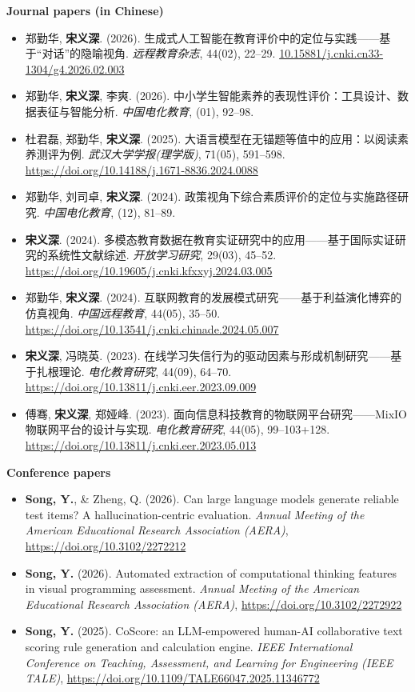 \documentclass[a4paper,9pt]{extarticle}
\begin{document}
\noindent
\textbf{Journal papers (in Chinese)}
\begin{itemize}
    \item 郑勤华, \textbf{宋义深}. (2026). 生成式人工智能在教育评价中的定位与实践——基于“对话”的隐喻视角. \textit{远程教育杂志}, 44(02), 22–29. \url{10.15881/j.cnki.cn33-1304/g4.2026.02.003}
    \item 郑勤华, \textbf{宋义深}, 李爽. (2026). 中小学生智能素养的表现性评价：工具设计、数据表征与智能分析. \textit{中国电化教育}, (01), 92–98.
    \item 杜君磊, 郑勤华, \textbf{宋义深}. (2025). 大语言模型在无锚题等值中的应用：以阅读素养测评为例. \textit{武汉大学学报(理学版)}, 71(05), 591–598. \url{https://doi.org/10.14188/j.1671-8836.2024.0088}
    \item 郑勤华, 刘司卓, \textbf{宋义深}. (2024). 政策视角下综合素质评价的定位与实施路径研究. \textit{中国电化教育}, (12), 81–89.
    \item \textbf{宋义深}. (2024). 多模态教育数据在教育实证研究中的应用——基于国际实证研究的系统性文献综述. \textit{开放学习研究}, 29(03), 45–52. \url{https://doi.org/10.19605/j.cnki.kfxxyj.2024.03.005}
    \item 郑勤华, \textbf{宋义深}. (2024). 互联网教育的发展模式研究——基于利益演化博弈的仿真视角. \textit{中国远程教育}, 44(05), 35–50. \url{https://doi.org/10.13541/j.cnki.chinade.2024.05.007}
    \item \textbf{宋义深}, 冯晓英. (2023). 在线学习失信行为的驱动因素与形成机制研究——基于扎根理论. \textit{电化教育研究}, 44(09), 64–70. \url{https://doi.org/10.13811/j.cnki.eer.2023.09.009}
    \item 傅骞, \textbf{宋义深}, 郑娅峰. (2023). 面向信息科技教育的物联网平台研究——MixIO物联网平台的设计与实现. \textit{电化教育研究}, 44(05), 99–103+128. \url{https://doi.org/10.13811/j.cnki.eer.2023.05.013}
\end{itemize}

\noindent
\textbf{Conference papers}
\begin{itemize}
    \item \textbf{Song, Y.}, \& Zheng, Q. (2026). Can large language models generate reliable test items? A hallucination-centric evaluation. \textit{Annual Meeting of the American Educational Research Association (AERA)}, \url{https://doi.org/10.3102/2272212}
    \item \textbf{Song, Y.} (2026). Automated extraction of computational thinking features in visual programming assessment. \textit{Annual Meeting of the American Educational Research Association (AERA)}, \url{https://doi.org/10.3102/2272922}
    \item \textbf{Song, Y.} (2025). CoScore: an LLM-empowered human-AI collaborative text scoring rule generation and calculation engine. \textit{IEEE International Conference on Teaching, Assessment, and Learning for Engineering (IEEE TALE)}, \url{https://doi.org/10.1109/TALE66047.2025.11346772}
\end{itemize}
\end{document}
